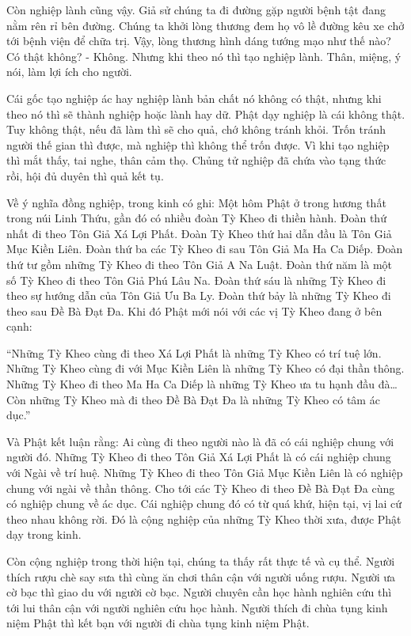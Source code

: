 \documentclass[
  12pt,
  oneside]{book}
\begin{document}
Còn nghiệp lành cũng vậy. Giả sử chúng ta đi đường gặp người bệnh tật đang nằm rên rỉ bên đường. Chúng ta khởi lòng thương đem họ vô lề đường kêu xe chở tới bệnh viện để chữa trị. Vậy, lòng thương hình dáng tướng mạo như thế nào? Có thật không? - Không. Nhưng khi theo nó thì tạo nghiệp lành. Thân, miệng, ý nói, làm lợi ích cho người.

Cái gốc tạo nghiệp ác hay nghiệp lành bản chất nó không có thật, nhưng khi theo nó thì sẽ thành nghiệp hoặc lành hay dữ. Phật dạy nghiệp là cái không thật. Tuy không thật, nếu đã làm thì sẽ cho quả, chớ không tránh khỏi. Trốn tránh người thế gian thì được, mà nghiệp thì không thể trốn được. Vì khi tạo nghiệp thì mắt thấy, tai nghe, thân cảm thọ. Chủng tử nghiệp đã chứa vào tạng thức rồi, hội đủ duyên thì quả kết tụ.

Về ý nghĩa đồng nghiệp, trong kinh có ghi: Một hôm Phật ở trong hương thất trong núi Linh Thứu, gần đó có nhiều đoàn Tỳ Kheo đi thiền hành. Đoàn thứ nhất đi theo Tôn Giả Xá Lợi Phất. Đoàn Tỳ Kheo thứ hai dẫn đầu là Tôn Giả Mục Kiền Liên. Đoàn thứ ba các Tỳ Kheo đi sau Tôn Giả Ma Ha Ca Diếp. Đoàn thứ tư gồm những Tỳ Kheo đi theo Tôn Giả A Na Luật. Đoàn thứ năm là một số Tỳ Kheo đi theo Tôn Giả Phú Lâu Na. Đoàn thứ sáu là những Tỳ Kheo đi theo sự hướng dẫn của Tôn Giả Ưu Ba Ly. Đoàn thứ bảy là những Tỳ Kheo đi theo sau Đề Bà Đạt Đa. Khi đó Phật mới nói với các vị Tỳ Kheo đang ở bên cạnh:

``Những Tỳ Kheo cùng đi theo Xá Lợi Phất là những Tỳ Kheo có trí tuệ lớn. Những Tỳ Kheo cùng đi với Mục Kiền Liên là những Tỳ Kheo có đại thần thông. Những Tỳ Kheo đi theo Ma Ha Ca Diếp là những Tỳ Kheo ưa tu hạnh đầu đà\ldots{} Còn những Tỳ Kheo mà đi theo Đề Bà Đạt Đa là những Tỳ Kheo có tâm ác dục.''

Và Phật kết luận rằng: Ai cùng đi theo người nào là đã có cái nghiệp chung với người đó. Những Tỳ Kheo đi theo Tôn Giả Xá Lợi Phất là có cái nghiệp chung với Ngài về trí huệ. Những Tỳ Kheo đi theo Tôn Giả Mục Kiền Liên là có nghiệp chung với ngài về thần thông. Cho tới các Tỳ Kheo đi theo Đề Bà Đạt Đa cùng có nghiệp chung về ác dục. Cái nghiệp chung đó có từ quá khứ, hiện tại, vị lai cứ theo nhau không rời. Đó là cộng nghiệp của những Tỳ Kheo thời xưa, được Phật dạy trong kinh.

Còn cộng nghiệp trong thời hiện tại, chúng ta thấy rất thực tế và cụ thể. Người thích rượu chè say sưa thì cùng ăn chơi thân cận với người uống rượu. Người ưa cờ bạc thì giao du với người cờ bạc. Người chuyên cần học hành nghiên cứu thì tới lui thân cận với người nghiên cứu học hành. Người thích đi chùa tụng kinh niệm Phật thì kết bạn với người đi chùa tụng kinh niệm Phật.
\end{document}
